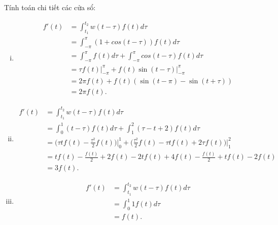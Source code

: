 		Tính toán chi tiết các cửa sổ:
			\begin{enumerate}[i)]
				\item {}
				
					\begin{equation*}
						\begin{aligned}
							f'(t)	& = \int_{t_1}^{t_2} w(t - \tau) f(t) d\tau \\
							& = \int_{-\pi}^{\pi} (1 + cos(t - \tau)) f(t) d\tau \\
							& = \int_{-\pi}^{\pi} f(t) d\tau + \int_{-\pi}^{\pi} cos(t - \tau) f(t) d\tau \\
							& = \tau f(t) \bigg \rvert_{-\pi}^{\pi} + f(t) \sin(t - \tau) \bigg \rvert_{-\pi}^{\pi} \\
							& = 2\pi f(t) + f(t) (\sin(t - \pi) - \sin(t + \tau)) \\
							& = 2\pi f(t).
						\end{aligned}
					\end{equation*}
				
				\item {}
				
					\begin{equation*}
						\begin{aligned}
							f'(t)	& = \int_{t_1}^{t_2} w(t - \tau) f(t) d\tau \\
							& = \int_{0}^{1} (t - \tau) f(t) d\tau + \int_{1}^{2} (\tau - t + 2) f(t) d\tau \\
							& = \bigg( \tau t f(t) - \frac{\tau^2}{2} f(t) \bigg)\bigg \rvert_0^1 + \bigg( \frac{\tau^2}{2} f(t) - \tau t f(t) + 2\tau f(t) \bigg) \bigg \rvert_1^2\\
							& = t f(t) - \frac{f(t)}{2}
							+ 2f(t) - 2t f(t) + 4f(t) 
							- \frac{f(t)}{2} + t f(t) - 2f(t)\\
							& = 3 f(t).
						\end{aligned}
					\end{equation*}
				
				\item {}
				
					\begin{equation*}
						\begin{aligned}
							f'(t)	& = \int_{t_1}^{t_2} w(t - \tau) f(t) d\tau \\
							& = \int_{0}^{1} 1 f(t) d\tau \\
							& = f(t).
						\end{aligned}
					\end{equation*}
				
			\end{enumerate}
		
